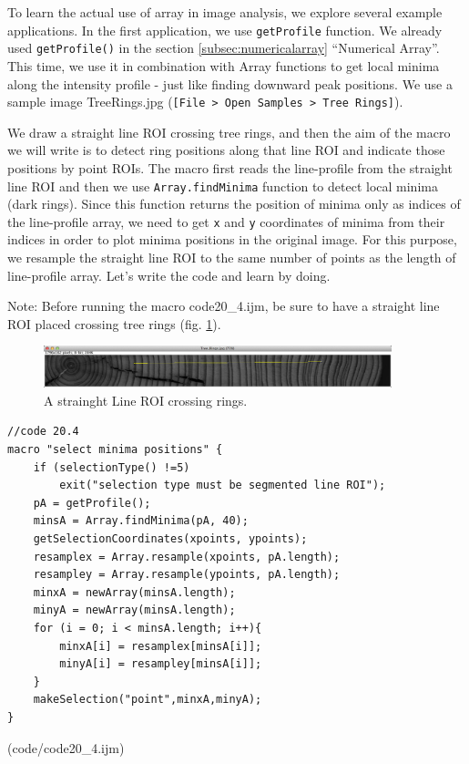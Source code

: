 \documentclass[11pt,a4paper,oneside]{report}
\newcommand{\ijmenu}[1]{\texttt{\small#1}}
\newcommand{\ilcom}[1]{\texttt{\small#1}}
\begin{document}
To learn the actual use of array in image analysis, we explore several example applications. In the first application, we use \ilcom{getProfile} function. We already used \ilcom{getProfile()} in the section \ref{subsec:numericalarray} ``Numerical Array''. This time, we use it in combination with Array functions to get local minima along the intensity profile - just like finding downward peak positions. We use a sample image Tree\textunderscore Rings.jpg (\ijmenu{[File > Open Samples > Tree Rings]}). 
 
We draw a straight line ROI crossing tree rings, and then the aim of the macro we will write is to detect ring positions along that line ROI and indicate those positions by point ROIs. The macro first reads the line-profile from the straight line ROI and then we use \ilcom{Array.findMinima} function to detect local minima (dark rings). Since this function returns the position of minima only as indices of the line-profile array, we need to get \ilcom{x} and \ilcom{y} coordinates of minima from their indices in order to plot minima positions in the original image. For this purpose, we resample the straight line ROI to the same number of points as the length of line-profile array. Let's write the code and learn by doing. 

Note: Before running the macro code20\_4.ijm, be sure to have a straight line ROI placed crossing tree rings (fig. \ref{fig:treeRingsSelected}). 

\begin{figure}[h!]
\begin{center}
\includegraphics[width=0.9\textwidth]{fig/Tree_Rings_Selected.png}
\caption{A strainght Line ROI crossing rings.}
\label{fig:treeRingsSelected}
\end{center}
\end{figure}



\begin{lstlisting}[morekeywords={*, getProfile, Array, findMinima, resample, print, getStatistics}]
//code 20.4
macro "select minima positions" {
	if (selectionType() !=5) 
		exit("selection type must be segmented line ROI");
	pA = getProfile();
	minsA = Array.findMinima(pA, 40);
	getSelectionCoordinates(xpoints, ypoints);
	resamplex = Array.resample(xpoints, pA.length);
	resampley = Array.resample(ypoints, pA.length);
	minxA = newArray(minsA.length);
	minyA = newArray(minsA.length);	
	for (i = 0; i < minsA.length; i++){
		minxA[i] = resamplex[minsA[i]];
		minyA[i] = resampley[minsA[i]];
	}
	makeSelection("point",minxA,minyA);
}
\end{lstlisting}
(code/code20_4.ijm)
\end{document}

